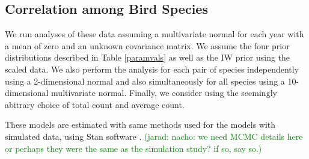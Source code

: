 \documentclass[12pt]{article}
\newcommand{\jarad}[1]{\textcolor{green}{(jarad: #1)}}
\begin{document}
%

\subsection{Correlation among Bird Species}

We run analyses of these data assuming a multivariate normal for each year with a mean of zero and an unknown covariance matrix. We assume the four prior distributions described in Table \ref{paramvals} as well as the IW prior using the scaled data. We also perform the analysis for each pair of species independently using a 2-dimensional normal and also simultaneously for all species using a 10-dimensional multivariate normal. Finally, we consider using the seemingly abitrary choice of total count and average count. 

These models are estimated with same methods used for the models with simulated data, using Stan software \citep{stan2014}. \jarad{nacho: we need MCMC details here or perhaps they were the same as the simulation study? if so, say so.}
\end{document}

